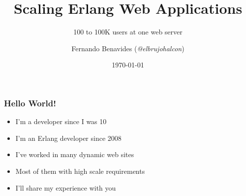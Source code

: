 \documentclass[utf8]{beamer}
\begin{document}
\title{Scaling Erlang Web Applications}
\subtitle{100 to 100K users at one web server}
\author{Fernando Benavides (\textit{@elbrujohalcon})}
\date{\today}


\frame{\titlepage} 

\begin{frame}[t]
	\frametitle{Hello World!}
	\begin{itemize}
		\item<+-> I'm a developer since I was 10
		\item<+-> I'm an Erlang developer since 2008
		\item<+-> I've worked in many dynamic web sites
		\item<+-> Most of them with high scale requirements
		\item<+-> I'll share my experience with you 
	\end{itemize}
\end{frame}
\end{document}
